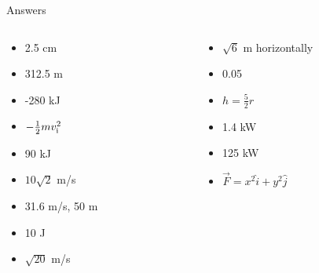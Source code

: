 \documentclass{beamer}
\begin{document}
\begin{frame}{Answers}
\begin{columns}[T]
\begin{column}{0.5\textwidth}
\begin{itemize}
\item 2.5 cm
\item 312.5 m
\item -280 kJ
\item $-\frac{1}{2} m v_{\rm i}^2$
\item 90 kJ
\item $10\sqrt{2}$ m/s
\item 31.6 m/s, 50 m
\item 10 J
\item $\sqrt{20}$ m/s
\end{itemize}
\end{column}
\begin{column}{0.5\textwidth}
\begin{itemize}
\item $\sqrt{6}$ m horizontally
\item 0.05
\item $h = \frac{5}{2}r$
\item 1.4 kW
\item 125 kW
\item $\vec{F} = x^2\hat{i}+y^2\hat{j}$
\end{itemize}
\end{column}
\end{columns}
\end{frame}
\end{document}
